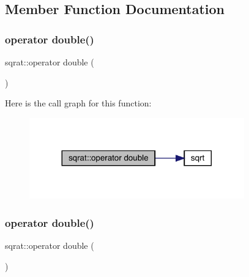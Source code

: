 \subsection{Member Function Documentation}
\mbox{\label{classsqrat_af1d90ee59e36a87aa7a94dacdab875de}} 
\subsubsection{\texorpdfstring{operator double()}{operator double()}\hspace{0.1cm}{\footnotesize\ttfamily [1/2]}}
{\footnotesize\ttfamily sqrat\+::operator double (\begin{DoxyParamCaption}{ }\end{DoxyParamCaption})\hspace{0.3cm}{\ttfamily [explicit]}}

Here is the call graph for this function\+:\nopagebreak
\begin{figure}[H]
\begin{center}
\leavevmode
\includegraphics[width=263pt]{df/d67/classsqrat_af1d90ee59e36a87aa7a94dacdab875de_cgraph}
\end{center}
\end{figure}
\mbox{\label{classsqrat_af1d90ee59e36a87aa7a94dacdab875de}} 
\subsubsection{\texorpdfstring{operator double()}{operator double()}\hspace{0.1cm}{\footnotesize\ttfamily [2/2]}}
{\footnotesize\ttfamily sqrat\+::operator double (\begin{DoxyParamCaption}{ }\end{DoxyParamCaption})\hspace{0.3cm}{\ttfamily [explicit]}}

